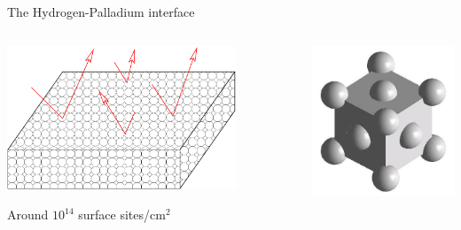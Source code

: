 \documentclass[12pt,a4paper,CJK]{beamer}
\begin{document}
\begin{CJK*}{UTF8}{gkai}
\begin{frame}{The Hydrogen-Palladium interface}
\begin{columns}
  \begin{column}{.6\textwidth}
    \includegraphics[width=0.8\textwidth]{figs/bounce.pdf}
    \smallskip

    Around $10^{14}$ surface sites/cm$^2$
  \end{column}
\pause
  \begin{column}{.3\textwidth}
    \includegraphics[width=\textwidth]{figs/fcc.jpg}
  \end{column}
\end{columns}
\end{frame}


\end{CJK*}
\end{document}
